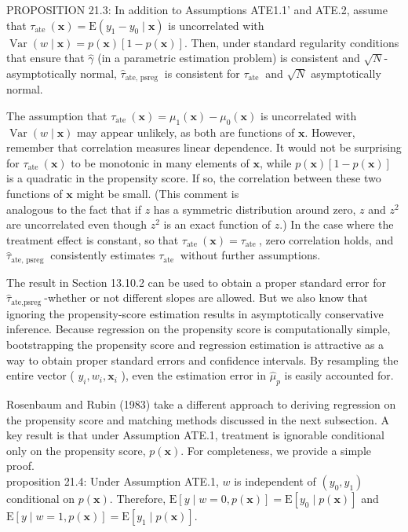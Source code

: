 \documentclass[10pt]{article}
\begin{document}
PROPOSITION 21.3: In addition to Assumptions ATE1.1' and ATE.2, assume that $\tau_{\text {ate }}(\mathbf{x})=\mathrm{E}\left(y_{1}-y_{0} \mid \mathbf{x}\right)$ is uncorrelated with $\operatorname{Var}(w \mid \mathbf{x})=p(\mathbf{x})[1-p(\mathbf{x})]$. Then, under standard regularity conditions that ensure that $\hat{\gamma}$ (in a parametric estimation problem) is consistent and $\sqrt{N}$-asymptotically normal, $\hat{\tau}_{\text {ate, psreg }}$ is consistent for $\tau_{\text {ate }}$ and $\sqrt{N}$ asymptotically normal.

The assumption that $\tau_{\text {ate }}(\mathbf{x})=\mu_{1}(\mathbf{x})-\mu_{0}(\mathbf{x})$ is uncorrelated with $\operatorname{Var}(w \mid \mathbf{x})$ may appear unlikely, as both are functions of $\mathbf{x}$. However, remember that correlation measures linear dependence. It would not be surprising for $\tau_{\text {ate }}(\mathbf{x})$ to be monotonic in many elements of $\mathbf{x}$, while $p(\mathbf{x})[1-p(\mathbf{x})]$ is a quadratic in the propensity score. If so, the correlation between these two functions of $\mathbf{x}$ might be small. (This comment is\\
analogous to the fact that if $z$ has a symmetric distribution around zero, $z$ and $z^{2}$ are uncorrelated even though $z^{2}$ is an exact function of $z$.) In the case where the treatment effect is constant, so that $\tau_{\text {ate }}(\mathbf{x})=\tau_{\text {ate }}$, zero correlation holds, and $\hat{\tau}_{\text {ate, psreg }}$ consistently estimates $\tau_{\text {ate }}$ without further assumptions.

The result in Section 13.10.2 can be used to obtain a proper standard error for $\hat{\tau}_{\text {ate,psreg }}$-whether or not different slopes are allowed. But we also know that ignoring the propensity-score estimation results in asymptotically conservative inference. Because regression on the propensity score is computationally simple, bootstrapping the propensity score and regression estimation is attractive as a way to obtain proper standard errors and confidence intervals. By resampling the entire vector ( $y_{i}, w_{i}, \mathbf{x}_{i}$ ), even the estimation error in $\hat{\mu}_{p}$ is easily accounted for.

Rosenbaum and Rubin (1983) take a different approach to deriving regression on the propensity score and matching methods discussed in the next subsection. A key result is that under Assumption ATE.1, treatment is ignorable conditional only on the propensity score, $p(\mathbf{x})$. For completeness, we provide a simple proof.\\
proposition 21.4: Under Assumption ATE.1, $w$ is independent of $\left(y_{0}, y_{1}\right)$ conditional on $p(\mathbf{x})$. Therefore, $\mathrm{E}[y \mid w=0, p(\mathbf{x})]=\mathrm{E}\left[y_{0} \mid p(\mathbf{x})\right]$ and $\mathrm{E}[y \mid w=1, p(\mathbf{x})]= \mathrm{E}\left[y_{1} \mid p(\mathbf{x})\right]$.
\end{document}
